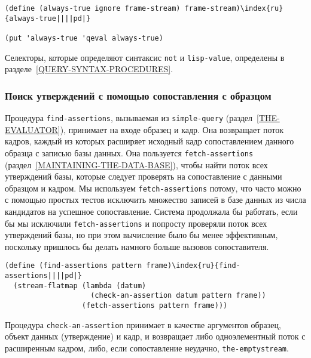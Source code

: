 \begin{Verbatim}[fontsize=\small]
(define (always-true ignore frame-stream) frame-stream)\index{ru}{always-true||||pd|}

(put 'always-true 'qeval always-true)
\end{Verbatim}
Селекторы, которые определяют синтаксис {\tt not} и
{\tt lisp-value}, определены в 
разделе~\ref{QUERY-SYNTAX-PROCEDURES}.

\subsubsection{Поиск утверждений с помощью сопоставления с
образцом}
\label{FINDING-ASSERTIONS-BY-PATTERN-MATCHING}%

Процедура {\tt find-assertions}, вызываемая из
{\tt simple-query} (раз\-дел~\ref{THE-EVALUATOR}),
принимает на входе образец и кадр.  Она возвращает поток кадров,
каждый из которых расширяет исходный кадр сопоставлением данного
образца с записью базы данных.  Она пользуется
{\tt fetch-assertions} (раздел~\ref{MAINTAINING-THE-DATA-BASE}),
чтобы найти поток всех утверждений базы, которые следует проверять на
сопоставление с данными образцом и кадром.  Мы используем
{\tt fetch-assertions} потому, что часто можно с помощью
простых тестов исключить множество записей в базе данных из числа
кандидатов на успешное сопоставление.  Система продолжала бы работать,
если бы мы исключили {\tt fetch-assertions} и попросту
проверяли поток всех утверждений базы, но при этом вычисление было бы
менее эффективным, поскольку пришлось бы делать намного больше вызовов
сопоставителя.
{\sloppy

}
\begin{Verbatim}[fontsize=\small]
(define (find-assertions pattern frame)\index{ru}{find-assertions||||pd|}
  (stream-flatmap (lambda (datum)
                    (check-an-assertion datum pattern frame))
                  (fetch-assertions pattern frame)))
\end{Verbatim}

Процедура {\tt check-an-assertion} принимает в
качестве аргументов образец, объект данных (утверждение) и кадр, и
возвращает либо одноэлементный поток с расширенным кадром, либо, если
сопоставление неудачно, {\tt the-empty\-stream}.

